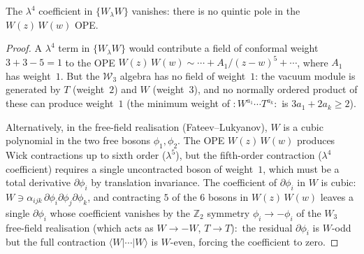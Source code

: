 \begin{proposition}
\label{prop:vacuum-selection-WW}
%
The $\lambda^4$ coefficient in $\{W_\lambda W\}$ vanishes:
there is no quintic pole in the $W(z)\,W(w)$ OPE.
\end{proposition}

\begin{proof}
A $\lambda^4$ term in $\{W_\lambda W\}$ would contribute
a field of conformal weight $3 + 3 - 5 = 1$ to the OPE
$W(z)\,W(w) \sim \cdots + A_1/(z-w)^5 + \cdots$, where
$A_1$ has weight~$1$. But the $\mathcal{W}_3$ algebra
has no field of weight~$1$: the vacuum module is generated
by $T$ (weight~$2$) and $W$ (weight~$3$), and no
normally ordered product of these can produce weight~$1$
(the minimum weight of ${:}W^{a_1} \cdots T^{a_k}{:}$
is $3a_1 + 2a_k \ge 2$).

Alternatively, in the free-field realisation
(Fateev--Lukyanov), $W$ is a cubic polynomial in the
two free bosons $\phi_1, \phi_2$. The OPE
$W(z)\,W(w)$ produces Wick contractions up to
sixth order ($\lambda^5$), but the fifth-order
contraction ($\lambda^4$ coefficient) requires a
single uncontracted boson of weight~$1$, which must
be a total derivative $\partial\phi_i$ by translation
invariance. The coefficient of $\partial\phi_i$ in
$W$ is cubic: $W \ni \alpha_{ijk}\,\partial\phi_i
\partial\phi_j \partial\phi_k$, and contracting $5$
of the $6$ bosons in $W(z)\,W(w)$ leaves a single
$\partial\phi_i$ whose coefficient vanishes by the
$\mathbb{Z}_2$ symmetry $\phi_i \to -\phi_i$ of the
$W_3$ free-field realisation (which acts as $W \to -W$,
$T \to T$):\ the residual $\partial\phi_i$ is
$W$-odd but the full contraction $\langle W | \cdots |
W \rangle$ is $W$-even, forcing the coefficient to zero.
\end{proof}

